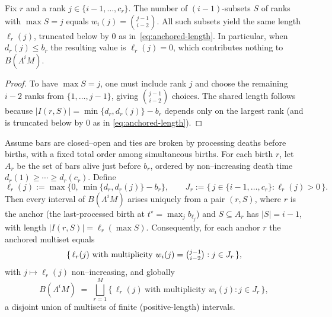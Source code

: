 \documentclass[runningheads]{llncs}
\newcommand{\B}{B}
\newcommand{\Lam}{\Lambda}
\begin{document}
\begin{proposition}\label{prop:multiplicity-fixed-largest}
Fix $r$ and a rank $j\in\{i-1,\dots,c_r\}$. The number of $(i-1)$-subsets $S$
of ranks with $\max S=j$ equals $w_i(j)=\binom{j-1}{i-2}$. All such subsets yield
the same length $\ell_r(j)$, truncated below by $0$ as in~\eqref{eq:anchored-length}.
In particular, when $d_r(j)\le b_r$ the resulting value is $\ell_r(j)=0$, which
contributes nothing to $\B(\Lam^i M)$.
\end{proposition}

\begin{proof}
To have $\max S=j$, one must include rank $j$ and choose the remaining $i{-}2$ ranks from $\{1,\dots,j-1\}$, giving $\binom{j-1}{i-2}$ choices. The shared length follows because $|I(r,S)|=\min\{d_r,d_r(j)\}-b_r$ depends only on the largest rank (and is truncated below by $0$ as in \eqref{eq:anchored-length}).
\end{proof}










\begin{theorem}\label{thm:anchored-grouping}
Assume bars are closed--open and ties are broken by processing deaths before births,
with a fixed total order among simultaneous births. For each birth $r$, let $A_r$
be the set of bars alive just before $b_r$, ordered by non--increasing death
time $d_r(1)\ge\cdots\ge d_r(c_r)$. Define
\[
  \ell_r(j):=\max\{0,\ \min\{d_r,d_r(j)\}-b_r\},\qquad
  J_r:=\{\,j\in\{i-1,\dots,c_r\}: \ell_r(j)>0\,\}.
\]
Then every interval of $\B(\Lambda^i M)$ arises uniquely from a pair $(r,S)$,
where $r$ is the anchor (the last-processed birth at
$t^\star=\max_j b_{\ell_j}$) and $S\subseteq A_r$ has $|S|=i-1$,
with length $|I(r,S)|=\ell_r(\max S)$. Consequently, for each anchor $r$ the
anchored multiset equals
\[
  \{\, \ell_r(j)\ \text{with multiplicity } w_i(j)=\tbinom{j-1}{i-2}
    : j\in J_r \,\},
\]
with $j\mapsto \ell_r(j)$ non--increasing, and globally
\[
  \B(\Lambda^i M)\;=\;\bigsqcup_{r=1}^M
  \{\, \ell_r(j)\ \text{with multiplicity } w_i(j): j\in J_r \,\},
\]
a disjoint union of multisets of finite (positive-length) intervals.
\end{theorem}
\end{document}
